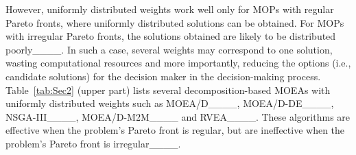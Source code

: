 


However, uniformly distributed weights work well only for MOPs with regular Pareto fronts, where uniformly distributed solutions can be obtained. For MOPs with irregular Pareto fronts, the solutions obtained are likely to be distributed poorly____. In such a case, several weights may correspond to one solution, wasting computational resources and more importantly, reducing the options (i.e., candidate solutions) for the decision maker in the decision-making process. 
Table~\ref{tab:Sec2} (upper part) lists several decomposition-based MOEAs with uniformly distributed
weights such as MOEA/D____, MOEA/D-DE____, NSGA-III____, MOEA/D-M2M____ and RVEA____. These algorithms are effective when the problem's Pareto front is regular, but are ineffective when the problem's Pareto front is irregular____.

\begin{comment}
\begin{table}[tbp]
	\centering
	\caption{\sout{Performance of representative MOEA/D algorithms for regular and irregular Pareto fronts.}}
	\begin{tabular}{p{3cm}<{\centering}m{1cm}<{\centering}m{1.6cm}<{\centering}m{1.7cm}<{\centering}}
		\hline
		\specialrule{0em}{1pt}{1pt}
		\multirow{2}[0]{*}{Algorithm} & \multirow{2}[0]{*}{Type} & \multicolumn{2}{c}{Pareto fronts} \\
		\specialrule{0em}{1pt}{1pt}
		&       & Regular & Irregular \\
        \specialrule{0em}{1pt}{1pt}
		\hline
		\specialrule{0em}{1pt}{1pt}
		 \multicolumn{1}{m{3cm}}{MOEA/D____, MOEA/D-DE____, NSGA-III____, MOEA/D-M2M____, RVEA____} & fixed weights & excellent & poor\\
		\hline
		\specialrule{0em}{1pt}{1pt}
		 \multicolumn{1}{m{3cm}}{MOEA/D-AWA____, iRVEA____, MOEA/D-LTD____, DEA-GNG____, RVEA-iGNG____, MOEA/D-LTD____, AdaW____, MOEA/D-AM2M____, A-NSGA-III____,  RVEA*____, g-DBEA____} & adaptive weights & worse than weight-fixing algorithms & better than weight-fixing algorithms\\
        \specialrule{0em}{1pt}{1pt}
		\hline
	\end{tabular}
	\label{tab:addlabel}
 \miqing{the alignment does not look good...}
\end{table}
\end{comment}

